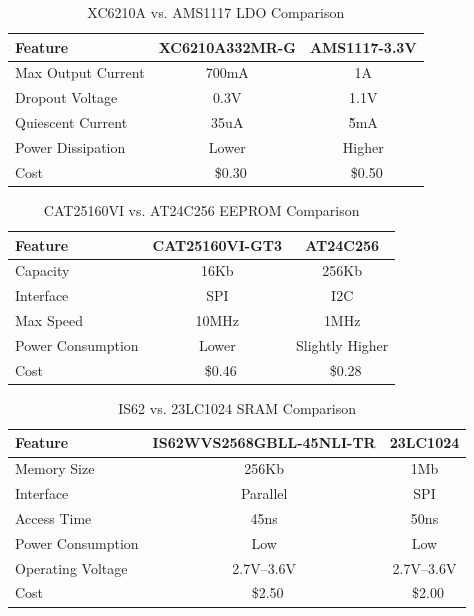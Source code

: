 \documentclass[12pt]{article}
\begin{document}
\begin{table}[H]
\centering
\begin{tabular}{|l|c|c|}
\hline
\textbf{Feature} & \textbf{XC6210A332MR-G} & \textbf{AMS1117-3.3V} \\
\hline
Max Output Current & 700mA & 1A \\
Dropout Voltage & 0.3V & 1.1V \\
Quiescent Current & 35uA & \~5mA \\
Power Dissipation & Lower & Higher \\
Cost & ~\$0.30 & ~\$0.50 \\
\hline
\end{tabular}
\caption{XC6210A vs. AMS1117 LDO Comparison}
\label{xc6210_vs_ams1117}
\end{table}

\begin{table}[H]
\centering
\begin{tabular}{|l|c|c|}
\hline
\textbf{Feature} & \textbf{CAT25160VI-GT3} & \textbf{AT24C256} \\
\hline
Capacity & 16Kb & 256Kb \\
Interface & SPI & I2C \\
Max Speed & 10MHz & 1MHz \\
Power Consumption & Lower & Slightly Higher \\
Cost & ~\$0.46 & ~\$0.28 \\
\hline
\end{tabular}
\caption{CAT25160VI vs. AT24C256 EEPROM Comparison}
\label{cat25160_vs_at24c256}
\end{table}

\begin{table}[H]
\centering
\begin{tabular}{|l|c|c|}
\hline
\textbf{Feature} & \textbf{IS62WVS2568GBLL-45NLI-TR} & \textbf{23LC1024} \\
\hline
Memory Size & 256Kb & 1Mb \\
Interface & Parallel & SPI \\
Access Time & 45ns & 50ns \\
Power Consumption & Low & Low \\
Operating Voltage & 2.7V–3.6V & 2.7V–3.6V \\
Cost & ~\$2.50 & ~\$2.00 \\
\hline
\end{tabular}
\caption{IS62 vs. 23LC1024 SRAM Comparison}
\label{is62_vs_23lc1024}
\end{table}
\end{document}
